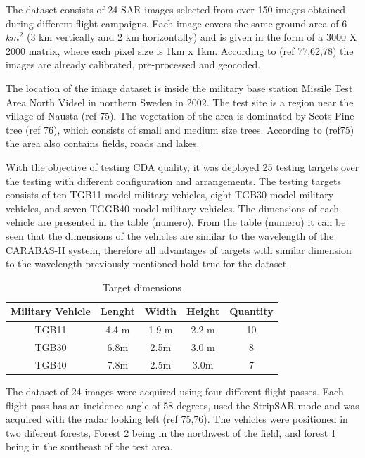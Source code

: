 The dataset consists of 24 SAR images selected from over 150 images obtained during different flight campaigns.
Each image covers the same ground area of 6 $km^2$ (3 km vertically and 2 km horizontally)
and is given in the form of a 3000 X 2000 matrix, where each pixel size is 1km x 1km.
According to (ref 77,62,78) the images are already calibrated, pre-processed and geocoded.

The location of the image dataset is inside the military base station Missile Test Area North
Vidsel in northern Sweden in 2002. The test site is a region near the village of Nausta (ref 75).
The vegetation of the area is dominated by Scots Pine tree (ref 76), which consists of small and medium size trees.
According to (ref75) the area also contains fields, roads and lakes.

With the objective of testing CDA quality, it was deployed 25 testing targets over the testing with different configuration 
and arrangements. The testing targets consists of ten TGB11 model military vehicles, eight TGB30 model 
military vehicles, and seven TGGB40 model military vehicles. The dimensions of each vehicle are presented in the table (numero).
From the table (numero) it can be seen that the dimensions of the vehicles are similar to the wavelength of the CARABAS-II system,
therefore all advantages of targets with similar dimension to the wavelength previously mentioned hold true for the dataset.

\begin{table}[h]
    \centering
    \begin{tabular}{|c|c|c|c|c|}
        \hline
        Military Vehicle & Lenght & Width & Height & Quantity \\ \hline
        TGB11 & 4.4 m & 1.9 m & 2.2 m & 10 \\ \hline
        TGB30 & 6.8m & 2.5m & 3.0 m & 8 \\ \hline
        TGB40 & 7.8m & 2.5m & 3.0m & 7 \\ \hline
    \end{tabular}
    \caption{Target dimensions}
    \label{tab:vehicle_dimensions}
\end{table}


The dataset of 24 images were acquired using four different flight passes. Each 
flight pass has an incidence angle of 58 degrees, used the StripSAR mode and was acquired with the radar looking left (ref 75,76).
The vehicles were positioned in two diferent forests, Forest 2 being in the northwest of the field, and forest 1 being in the
southeast of the test area. 

